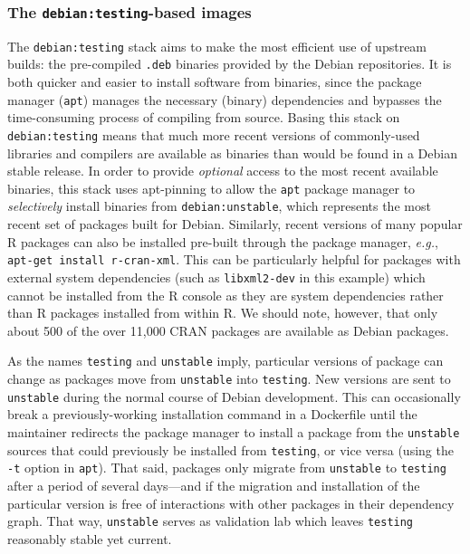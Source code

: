 \subsubsection{\texorpdfstring{The \texttt{debian:testing}-based
images}{The debian:testing-based images}}\label{the-debiantesting-based-images}

The \texttt{debian:testing} stack aims to make the most efficient use of
upstream builds: the pre-compiled \texttt{.deb} binaries provided by the
Debian repositories. It is both quicker and easier to install software
from binaries, since the package manager (\texttt{apt}) manages the
necessary (binary) dependencies and bypasses the time-consuming process
of compiling from source. Basing this stack on \texttt{debian:testing}
means that much more recent versions of commonly-used libraries and
compilers are available as binaries than would be found in a Debian
stable release. In order to provide \emph{optional} access to the most
recent available binaries, this stack uses apt-pinning
\citep{apt_pinning} to allow the \texttt{apt} package manager to
\emph{selectively} install binaries from \texttt{debian:unstable}, which
represents the most recent set of packages built for Debian. Similarly,
recent versions of many popular R packages can also be installed
pre-built through the package manager, \emph{e.g.},
\texttt{apt-get\ install\ r-cran-xml}. This can be particularly helpful
for packages with external system dependencies (such as
\texttt{libxml2-dev} in this example) which cannot be installed from the
R console as they are system dependencies rather than R packages
installed from within R. We should note, however, that only about 500 of
the over 11,000 CRAN packages are available as Debian packages.

As the names \texttt{testing} and \texttt{unstable} imply, particular
versions of package can change as packages move from \texttt{unstable}
into \texttt{testing}. New versions are sent to \texttt{unstable} during
the normal course of Debian development. This can occasionally break a
previously-working installation command in a Dockerfile until the
maintainer redirects the package manager to install a package from the
\texttt{unstable} sources that could previously be installed from
\texttt{testing}, or vice versa (using the \texttt{-t} option in
\texttt{apt}). That said, packages only migrate from \texttt{unstable}
to \texttt{testing} after a period of several days---and if the
migration and installation of the particular version is free of
interactions with other packages in their dependency graph. That way,
\texttt{unstable} serves as validation lab which leaves \texttt{testing}
reasonably stable yet current.

